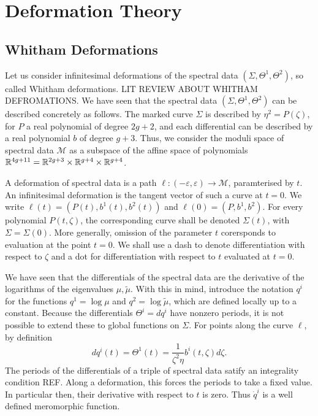 
\section{Deformation Theory}
\label{sec:Deformation Theory}

\subsection{Whitham Deformations}
Let us consider infinitesimal deformations of the spectral data $(Σ,Θ^1,Θ^2)$, so called Whitham deformations. LIT REVIEW ABOUT WHITHAM DEFROMATIONS\todo{}. We have seen that the spectral data $(Σ,Θ^1,Θ^2)$ can be described concretely as follows. The marked curve $Σ$ is described by $η^2 = P(ζ)$, for $P$ a real polynomial of degree $2g+2$, and each differential can be described by a real polynomial $b$ of degree $g+3$. Thus, we consider the moduli space of spectral data $\mathcal{M}$ as a subspace of the affine space of polynomials $\mathbb{R}^{4g+11} = \mathbb{R}^{2g+3}\times\mathbb{R}^{g+4}\times\mathbb{R}^{g+4}$.

A deformation of spectral data is a path $\ell:(-ε,ε) \to \mathcal{M}$, paramterised by $t$. An infinitesimal deformation is the tangent vector of such a curve at $t=0$. We write $\ell(t) = (P(t),b^1(t),b^2(t))$ and $\ell(0) = (P,b^1,b^2)$. For every polynomial $P(t,ζ)$, the corresponding curve shall be denoted $Σ(t)$, with $Σ = Σ(0)$. More generally, omission of the parameter $t$ corersponds to evaluation at the point $t=0$. We shall use a dash to denote differentiation with respect to $ζ$ and a dot for differentiation with respect to $t$ evaluated at $t=0$.

We have seen that the differentials of the spectral data are the derivative of the logarithms of the eigenvalues $μ,\tilde{μ}$. With this in mind, introduce the notation $q^i$ for the functions $q^1 = \log μ$ and $q^2 = \log \tilde{μ}$, which are defined locally up to a constant. Because the differentials $Θ^i = dq^i$ have nonzero periods, it is not possible to extend these to global functions on $Σ$. For points along the curve $\ell$, by definition
\[
dq^i(t) = Θ^1(t) = \frac{1}{\zeta^2\eta}b^i(t,\zeta) d\zeta.
\]
The periods of the differentials of a triple of spectral data satify an integrality condition REF. Along a deformation, this forces the periods to take a fixed value. In particular then, their derivative with respect to $t$ is zero. Thus $\dot q^i$ is a well defined meromorphic function.


